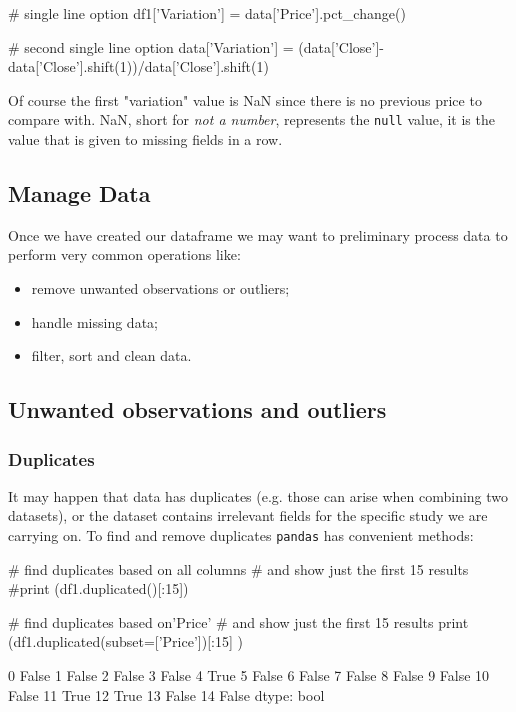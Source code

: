 \begin{ipython}
# single line option
df1['Variation'] = data['Price'].pct_change()

# second single line option
data['Variation'] =  (data['Close']-data['Close'].shift(1))/data['Close'].shift(1)
\end{ipython}

Of course the first "variation" value is NaN since there is no previous price to compare with. NaN, short for \emph{not a number}, represents the \texttt{null} value, it is the value that is given to missing fields in a row. 

\subsection{Manage Data}\label{manage-data}

Once we have created our dataframe we may want to preliminary process data to perform very common operations like:

\begin{itemize}
	\tightlist
\item remove unwanted observations or outliers;
\item handle missing data;
\item filter, sort and clean data.
\end{itemize}

\subsection{Unwanted observations and outliers}

\subsubsection{Duplicates}

It may happen that data has duplicates (e.g. those can arise when combining two datasets), or the dataset contains irrelevant fields for the specific study we are carrying on. To find and remove duplicates \texttt{pandas} has convenient methods:

\begin{ipython}
# find duplicates based on all columns
# and show just the first 15 results
#print (df1.duplicated()[:15])

# find duplicates based on'Price'
# and show just the first 15 results
print (df1.duplicated(subset=['Price'])[:15] )
\end{ipython}
\begin{ioutput}
0     False
1     False
2     False
3     False
4      True
5     False
6     False
7     False
8     False
9     False
10    False
11     True
12     True
13    False
14    False
dtype: bool
\end{ioutput}

